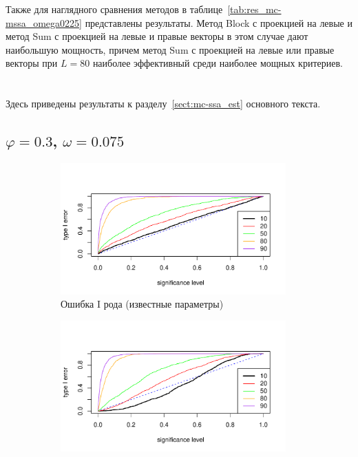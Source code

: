 \documentclass[specialist,
substylefile = spbu_report.rtx,
subf,href,colorlinks=true, 12pt]{disser}
\theoremstyle{definition}
\begin{document}
Также для наглядного сравнения методов в таблице~\ref{tab:res_mc-mssa_omega0225} представлены результаты. Метод Block с проекцией на левые и метод Sum с проекцией на левые и правые векторы в этом случае дают наибольшую мощность, причем метод Sum с проекцией на левые или правые векторы при $L=80$ наиболее эффективный среди наиболее мощных критериев.

\chapter{}
Здесь приведены результаты к разделу~\ref{sect:mc-ssa_est} основного текста.
\section{$\varphi=0.3$, $\omega=0.075$}
\begin{figure}[h!]
	\captionsetup[subfigure]{justification=Centering}
	\begin{subfigure}[t]{0.5\textwidth}
		\centering
		\includegraphics[width=0.95\textwidth]{img/type1error_phi3.pdf}
		\caption{Ошибка I рода (известные параметры)}
		\label{fig:arima_type1error}
	\end{subfigure}\hspace{\fill}
	\begin{subfigure}[t]{0.5\textwidth}
		\centering
		\includegraphics[width=0.95\textwidth]{img/type1error_phi3est.pdf}

\end{subfigure}
\end{figure}
\end{document}
